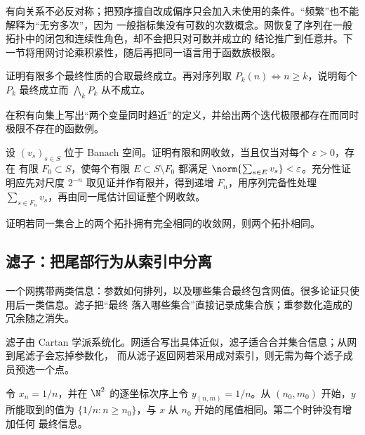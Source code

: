 有向关系不必反对称；把预序擅自改成偏序只会加入未使用的条件。“频繁”也不能解释为“无穷多次”，因为
一般指标集没有可数的次数概念。网恢复了序列在一般拓扑中的闭包和连续性角色，却不会把只对可数并成立的
结论推广到任意并。下一节将用网讨论乘积紧性，随后再把同一语言用于函数族极限。

\begin{exercise}
证明有限多个最终性质的合取最终成立。再对序列取 \(P_k(n)\Longleftrightarrow n\ge k\)，说明每个
\(P_k\) 最终成立而 \(\bigwedge_kP_k\) 从不成立。
\end{exercise}
\begin{exercise}
在积有向集上写出“两个变量同时趋近”的定义，并给出两个迭代极限都存在而同时极限不存在的函数例。
\end{exercise}
\begin{exercise}
设 \((v_s)_{s\in S}\) 位于 Banach 空间。证明有限和网收敛，当且仅当对每个 \(\varepsilon>0\)，存在
有限 \(F_0\subset S\)，使每个有限 \(E\subset S\setminus F_0\) 都满足
\(\norm{\sum_{s\in E}v_s}<\varepsilon\)。充分性证明应先对尺度 \(2^{-n}\) 取见证并作有限并，得到递增
\(F_n\)，用序列完备性处理 \(\sum_{s\in F_n}v_s\)，再由同一尾估计回证整个网收敛。
\end{exercise}
\begin{exercise}
证明若同一集合上的两个拓扑拥有完全相同的收敛网，则两个拓扑相同。
\end{exercise}

\subsection{滤子：把尾部行为从索引中分离}\label{subsec:1-1-2}

一个网携带两类信息：参数如何排列，以及哪些集合最终包含网值。很多论证只使用后一类信息。滤子把“最终
落入哪些集合”直接记录成集合族；重参数化造成的冗余随之消失。

\begin{remark}
滤子由 Cartan 学派系统化。网适合写出具体近似，滤子适合合并集合信息；从网到尾滤子会忘掉参数化，
而从滤子返回网若采用成对索引，则无需为每个滤子成员预选一个点。
\end{remark}

\begin{example}[重参数化后尾部信息不变]\label{ex:1-1-2-reparam}
令 \(x_n=1/n\)，并在 \(\N^2\) 的逐坐标次序上令 \(y_{(n,m)}=1/n\)。从 \((n_0,m_0)\) 开始，\(y\)
所能取到的值为 \(\{1/n:n\ge n_0\}\)，与 \(x\) 从 \(n_0\) 开始的尾值相同。第二个时钟没有增加任何
最终信息。
\end{example}

